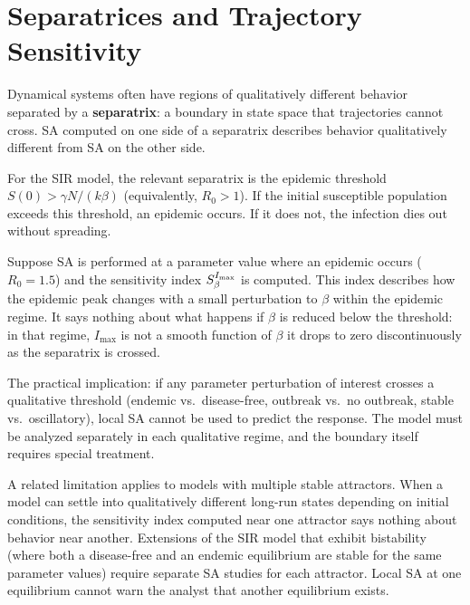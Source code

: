 \section{Separatrices and Trajectory Sensitivity}
\label{sec:separatrices}

Dynamical systems often have regions of qualitatively different behavior
separated by a \textbf{separatrix}: a boundary in state space that
trajectories cannot cross. SA computed on one side of a separatrix
describes behavior qualitatively different from SA on the other side.

For the SIR model, the relevant separatrix is the epidemic threshold
$S(0) > \gamma N / (k\beta)$ (equivalently, $R_0 > 1$). If the
initial susceptible population exceeds this threshold, an epidemic
occurs. If it does not, the infection dies out without spreading.

Suppose SA is performed at a parameter value where an epidemic occurs
($R_0 = 1.5$) and the sensitivity index $S_{\beta}^{I_{\max}}$
is computed. This index describes how the epidemic peak changes with
a small perturbation to $\beta$ within the epidemic regime.
It says nothing about what happens if $\beta$ is reduced below the
threshold: in that regime, $I_{\max}$ is not a smooth function of $\beta$
it drops to zero discontinuously as the separatrix is crossed.

The practical implication: if any parameter perturbation of interest
crosses a qualitative threshold (endemic vs.\ disease-free, outbreak
vs.\ no outbreak, stable vs.\ oscillatory), local SA cannot be used to
predict the response. The model must be analyzed separately in each
qualitative regime, and the boundary itself requires special treatment.

A related limitation applies to models with multiple stable attractors.
When a model can settle into qualitatively different long-run states
depending on initial conditions, the sensitivity index computed near one
attractor says nothing about behavior near another.
Extensions of the SIR model that exhibit bistability (where both a
disease-free and an endemic equilibrium are stable for the same parameter
values) require separate SA studies for each attractor.
Local SA at one equilibrium cannot warn the analyst that another
equilibrium exists.

